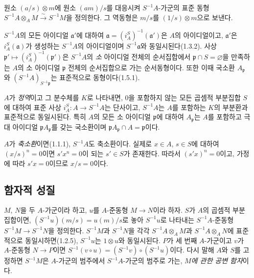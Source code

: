 \begin{env}[1.2.5]
\label{0.1.2.5-ko}
원소 $(a/s)\otimes m$에 원소 $(am)/s$를 대응시켜 $S^{-1}A$-가군의 표준 동형 $S^{-1}A\otimes_A M\xrightarrow{\sim}S^{-1}M$을 정의한다. 그 역동형은 $m/s$를 $(1/s)\otimes m$으로 보낸다.
\end{env}

\begin{env}[1.2.6]
\label{0.1.2.6-ko}
$S^{-1}A$의 모든 아이디얼 $\mathfrak{a}'$에 대하여 $\mathfrak{a}=(i_A^S)^{-1}(\mathfrak{a}')$은 $A$의 아이디얼이고, $\mathfrak{a}'$은 $i_A^S(\mathfrak{a})$가 생성하는 $S^{-1}A$의 아이디얼이며 $S^{-1}\mathfrak{a}$와 동일시된다(1.3.2).
사상 $\mathfrak{p}'\mapsto(i_A^S)^{-1}(\mathfrak{p}')$은 $S^{-1}A$의 \emph{소} 아이디얼 전체의 순서집합에서 $\mathfrak{p}\cap S=\varnothing$을 만족하는 $A$의 소 아이디얼 $\mathfrak{p}$ 전체의 순서집합으로 가는 순서동형이다.
또한 이때 국소환 $A_{\mathfrak{p}}$와 $(S^{-1}A)_{S^{-1}\mathfrak{p}}$는 표준적으로 동형이다(1.5.1).
\end{env}

\begin{env}[1.2.7]
\label{0.1.2.7-ko}
$A$가 \emph{정역}이고 그 분수체를 $K$로 나타내면, $0$을 포함하지 않는 모든 곱셈적 부분집합 $S$에 대하여 표준 사상 $i_A^S:A\to S^{-1}A$는 단사이고, $S^{-1}A$는 $A$를 포함하는 $K$의 부분환과 표준적으로 동일시된다.
특히 $A$의 모든 소 아이디얼 $\mathfrak{p}$에 대하여 $A_{\mathfrak{p}}$는 $A$를 포함하고 극대 아이디얼 $\mathfrak{p}A_{\mathfrak{p}}$를 갖는 국소환이며 $\mathfrak{p}A_{\mathfrak{p}}\cap A=\mathfrak{p}$이다.
\end{env}

\begin{env}[1.2.8]
\label{0.1.2.8-ko}
$A$가 \emph{축소환}이면(1.1.1), $S^{-1}A$도 축소환이다. 실제로 $x\in A$, $s\in S$에 대하여 $(x/s)^n=0$이면 $s'x^n=0$이 되는 $s'\in S$가 존재한다. 따라서 $(s'x)^n=0$이고, 가정에 따라 $s'x=0$이므로 $x/s=0$이다.
\end{env}

\subsection{함자적 성질}
\label{subsection:0.1.3-ko}

\begin{env}[1.3.1]
\label{0.1.3.1-ko}
$M$, $N$을 두 $A$-가군이라 하고, $u$를 $A$-준동형 $M\to N$이라 하자.
$S$가 $A$의 곱셈적 부분집합이면, $(S^{-1}u)(m/s)=u(m)/s$로 놓아 $S^{-1}u$로 나타내는 $S^{-1}A$-준동형 $S^{-1}M\to S^{-1}N$을 정의한다. $S^{-1}M$과 $S^{-1}N$을 각각 $S^{-1}A\otimes_A M$과 $S^{-1}A\otimes_A N$에 표준적으로 동일시하면(1.2.5), $S^{-1}u$는 $1\otimes u$와 동일시된다.
$P$가 세 번째 $A$-가군이고 $v$가 $A$-준동형 $N\to P$이면 $S^{-1}(v\circ u)=(S^{-1}v)\circ(S^{-1}u)$이다. 다시 말해 $A$와 $S$를 고정하면 $S^{-1}M$은 $A$-가군의 범주에서 $S^{-1}A$-가군의 범주로 가는, \emph{$M$에 관한 공변 함자}이다.
\end{env}

